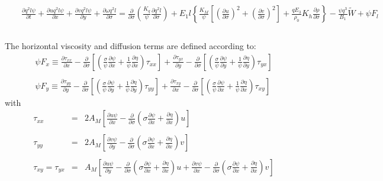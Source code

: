 \documentclass[oribibl]{llncs}
\begin{document}
\begin{eqnarray}
\\   
&&\frac{\partial q^2 l \psi}{\partial t} + \frac{\partial u q^2 l \psi}{\partial x} +\frac{\partial v q^2 l \psi}{\partial y} + \frac{\partial \omega q^2 l}{\partial \sigma}   = \frac{\partial}{\partial \sigma} \left( \frac{K_q}{\psi} \frac{\partial q^2 l}{\partial \sigma} \right)+ E_1  l \left\{ \frac{K_M}{\psi}\left[ \left( \frac{\partial u}{\partial \sigma}\right)^2 + \left( \frac{\partial v}{\partial \sigma}\right)^2 \right] + \frac{q E_3}{\rho_0}K_h\frac{\partial \rho}{\partial \sigma} \right\} - \frac{\psi q^3}{B_1} \widetilde{W} + \psi F_l    \label{eq:final7}\nonumber \\ 
\nonumber  \\ 
\end{eqnarray}

The horizontal viscosity and diffusion terms are defined according to:
\begin{eqnarray}
\psi F_x \equiv \frac{\partial \tau_{xx}}{\partial x} -\frac{\partial}{\partial \sigma} \left[ \left(  \frac{\sigma}{\psi} \frac{\partial \psi}{\partial x} + \frac{1}{\psi} \frac{\partial \eta}{\partial x} \right) \tau_{xx}  \right] +  \frac{\partial \tau_{yx}}{\partial y} -\frac{\partial}{\partial \sigma} \left[ \left(  \frac{\sigma}{\psi} \frac{\partial \psi}{\partial y} + \frac{1}{\psi} \frac{\partial \eta}{\partial y} \right) \tau_{yx}  \right]   \\ 
\nonumber \\ 
\psi F_y \equiv \frac{\partial \tau_{yy}}{\partial y} -\frac{\partial}{\partial \sigma} \left[ \left(  \frac{\sigma}{\psi} \frac{\partial \psi}{\partial y} + \frac{1}{\psi} \frac{\partial \eta}{\partial y} \right) \tau_{yy}  \right] +  \frac{\partial \tau_{xy}}{\partial x} -\frac{\partial}{\partial \sigma} \left[ \left(  \frac{\sigma}{\psi} \frac{\partial \psi}{\partial x} + \frac{1}{\psi} \frac{\partial \eta}{\partial x} \right) \tau_{xy}  \right]   
\end{eqnarray}
with
\begin{eqnarray}
\tau_{xx} &=& 2 A_M \left[ \frac{\partial u\psi}{\partial x} -\frac{\partial}{\partial \sigma} \left( \sigma \frac{\partial \psi}{\partial x} + \frac{\partial \eta}{\partial x} \right)u \right] \\
\nonumber \\
\tau_{yy} &=& 2 A_M \left[ \frac{\partial v\psi}{\partial y} -\frac{\partial}{\partial \sigma} \left( \sigma \frac{\partial \psi}{\partial x} + \frac{\partial \eta}{\partial x} \right)v \right] \\
\nonumber \\
\tau_{xy} = \tau_{yx} &=& A_M  \left[ \frac{\partial u\psi}{\partial y} -\frac{\partial}{\partial \sigma} \left( \sigma \frac{\partial \psi}{\partial x} + \frac{\partial \eta}{\partial x} \right)u +  \frac{\partial v\psi}{\partial x} -\frac{\partial}{\partial \sigma} \left( \sigma \frac{\partial \psi}{\partial x} + \frac{\partial \eta}{\partial x} \right)v \right]
\end{eqnarray}
\end{document}

